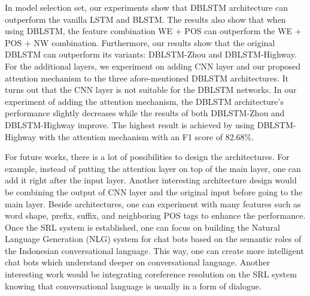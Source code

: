 
In model selection set, our experiments show that DBLSTM architecture can outperform the vanilla LSTM and BLSTM. The results also show that when using DBLSTM, the feature combination WE + POS can outperform the WE + POS + NW combination. Furthermore, our results show that the original DBLSTM can outperform its variants: DBLSTM-Zhou and DBLSTM-Highway. For the additional layers, we experiment on adding CNN layer and our proposed attention mechanism to the three afore-mentioned DBLSTM architectures. It turns out that the CNN layer is not suitable for the DBLSTM networks. In our experiment of adding the attention mechanism, the DBLSTM architecture's performance slightly decreases while the results of both DBLSTM-Zhou and DBLSTM-Highway improve. The highest result is achieved by using DBLSTM-Highway with the attention mechanism with an F1 score of 82.68\%.

For future works, there is a lot of possibilities to design the architectures. For example, instead of putting the attention layer on top of the main layer, one can add it right after the input layer. Another interesting architecture design would be combining the output of CNN layer and the original input before going to the main layer. Beside architectures, one can experiment with many features such as word shape, prefix, suffix, and neighboring POS tags to enhance the performance. Once the SRL system is established, one can focus on building the Natural Language Generation (NLG) system for chat bots based on the semantic roles of the Indonesian conversational language. This way, one can create more intelligent chat bots which understand deeper on conversational language. Another interesting work would be integrating coreference resolution on the SRL system knowing that conversational language is usually in a form of dialogue.




